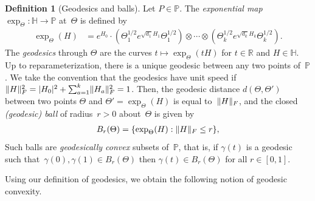 \documentclass[aos]{imsart}
\theoremstyle{definition}
\newtheorem*{definition}{Definition}
\numberwithin{equation}{section}
\DeclarePairedDelimiter{\abs}{\lvert}{\rvert}
\DeclarePairedDelimiter{\norm}{\lVert}{\rVert}
\newcommand{\R}{{\mathbb{R}}}
\renewcommand{\P}{{\mathbb{P}}}
\renewcommand{\H}{{\mathbb{H}}}
\newcommand{\ot}{\otimes}
\begin{document}
\begin{definition}[Geodesics and balls]
Let $P\in\P$.
The \emph{exponential map} $\exp_\Theta \colon \H \to \P$ at~$\Theta$ is defined by
\begin{align*}
  \exp_\Theta(H) &= e^{H_0} \cdot ( \Theta_1^{1/2} e^{\sqrt{d_1} H_1} \Theta_1^{1/2}) \ot \cdots \ot (\Theta_k^{1/2} e^{\sqrt{d_k} H_k} \Theta_k^{1/2}).
\end{align*}
The \emph{geodesics} through $\Theta$ are the curves $t \mapsto \exp_\Theta(t H)$ for $t\in\R$ and $H\in\H$.
Up to reparameterization, there is a unique geodesic between any two points of~$\P$.
We take the convention that the geodesics have unit speed if $\norm{H}_F^2 = \abs{H_0}^2 + \sum_{a=1}^k \norm{H_a}_F^2 = 1$.
Then, the geodesic distance $d(\Theta,\Theta')$ between two points $\Theta$ and $\Theta'=\exp_\Theta(H)$ is equal to~$\norm H_F$, and the closed \emph{(geodesic) ball} of radius~$r>0$ about~$\Theta$ is given by
\begin{align*}
  B_r(\Theta) = \{ \exp_\Theta(H) : \norm H_F \leq r \},
\end{align*}
Such balls are \emph{geodesically convex} subsets of~$\P$, that is, if $\gamma(t)$ is a geodesic such that~$\gamma(0),\gamma(1) \in B_r(\Theta)$ then $\gamma(t) \in B_r(\Theta)$ for all $r\in[0,1]$.
\end{definition}

Using our definition of geodesics, we obtain the following notion of geodesic convexity.
\end{document}
